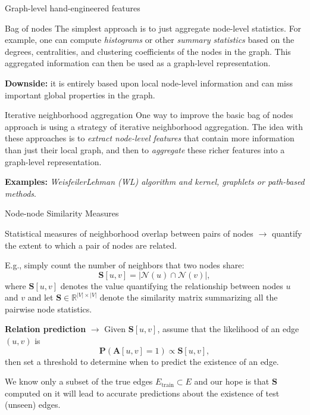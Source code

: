 \documentclass[10pt, aspectratio=169, compress, protectframetitle, handout]{beamer}
\begin{document}
\begin{frame}{Graph-level hand-engineered features}

    \begin{block}{Bag of nodes}
        The simplest approach is to just \alert{aggregate node-level statistics}. For example, one can compute \emph{histograms} or other \emph{summary statistics} based on the degrees, centralities, and clustering coefficients of the nodes in the graph. This aggregated information can then be used as a graph-level representation.
        \smallskip
        
        \textbf{Downside:} it is entirely based upon local node-level information and can miss important global properties in the graph.
    \end{block}
    
    \begin{block}{Iterative neighborhood aggregation}
        One way to improve the basic bag of nodes approach is using a strategy of \alert{iterative neighborhood aggregation}. The idea with these approaches is to \emph{extract node-level features} that contain more information than just their local graph, and then to \emph{aggregate} these richer features into a graph-level representation.
        
        \textbf{Examples:} \emph{WeisfeilerLehman (WL) algorithm and kernel, graphlets or path-based methods}.
    \end{block}
    
\end{frame}


\begin{frame}{Node-node Similarity Measures}

    Statistical \alert{measures of neighborhood overlap} between pairs of nodes $\longrightarrow$ quantify the extent to which a pair of nodes are related.
    
    \begin{block}{}%
    E.g., simply count the number of neighbors that two nodes share:
    \begin{equation}
        \mathbf S[u, v] = |\mathcal N(u) \cap \mathcal N(v)|,
    \end{equation}
    where $\mathbf S[u, v]$ denotes the value quantifying the relationship between nodes $u$ and $v$ and let $\mathbf S \in \mathbb R^{|V| \times |V|}$ denote the \alert{similarity matrix} summarizing all the pairwise node statistics.
    \end{block}

    \textbf{Relation prediction} $\longrightarrow$ Given $\mathbf S[u, v]$, assume that the likelihood of an edge $(u, v)$ is
    \begin{equation}
        \mathbf P (\mathbf A[u, v] = 1) \propto \mathbf S[u, v],
    \end{equation}
    then set a threshold to determine when to predict the existence of an edge.
    
    We know only a subset of the true edges $E_\text{train} \subset E$ and our hope is that $\mathbf S$ computed on it will lead to accurate predictions about the existence of test (unseen) edges.
    
\end{frame}
\end{document}
